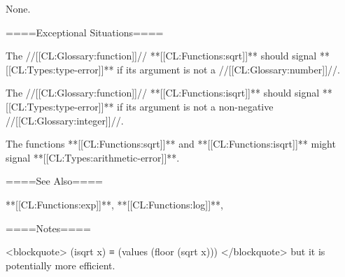 None.

====Exceptional Situations====

The //[[CL:Glossary:function]]// **[[CL:Functions:sqrt]]** should signal **[[CL:Types:type-error]]** if its argument is not a //[[CL:Glossary:number]]//.

The //[[CL:Glossary:function]]// **[[CL:Functions:isqrt]]** should signal **[[CL:Types:type-error]]** if its argument is not a non-negative //[[CL:Glossary:integer]]//.

The functions **[[CL:Functions:sqrt]]** and **[[CL:Functions:isqrt]]** might signal **[[CL:Types:arithmetic-error]]**.

====See Also====

**[[CL:Functions:exp]]**, **[[CL:Functions:log]]**, {\secref\FloatSubstitutability}

====Notes====

<blockquote> (isqrt x) ≡ (values (floor (sqrt x))) </blockquote> but it is potentially more efficient.

